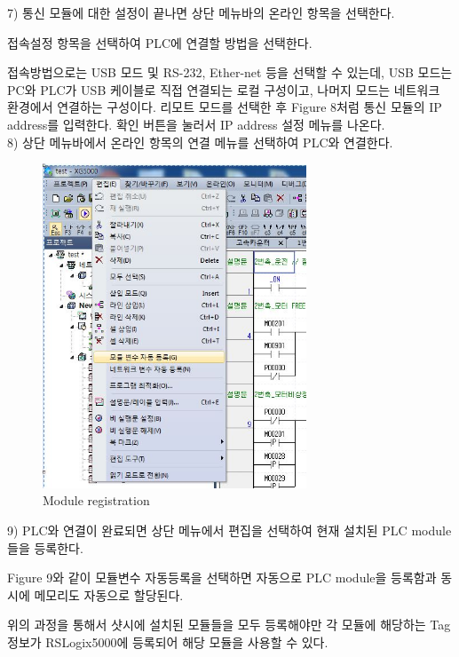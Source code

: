 \documentclass[11pt
  , a4paper
  , article
  , oneside
]{memoir}
\begin{document}
   7) 통신 모듈에 대한 설정이 끝나면 상단 메뉴바의 온라인 항목을 선택한다.\
   
   접속설정 항목을 선택하여 PLC에 연결할 방법을 선택한다.\
   
   접속방법으로는 USB 모드 및 RS-232, Ether-net 등을 선택할 수 있는데, USB 모드는 PC와 PLC가 USB 케이블로 직접 연결되는 로컬 구성이고, 나머지 모드는 네트워크 환경에서 연결하는 구성이다. 리모트 모드를 선택한 후 Figure 8처럼 통신 모듈의 IP address를 입력한다. 확인 버튼을 눌러서 IP address 설정 메뉴를 나온다.\\
   
   8) 상단 메뉴바에서 온라인 항목의 연결 메뉴를 선택하여 PLC와 연결한다. \\
   
     \begin{figure}[h]
     	\centering
     	\includegraphics[width=0.7\textwidth]{./picture/module_var_regist.JPG}
     	\caption{
     		Module registration
     	}
     	\label{fig:}
     \end{figure}
  
   9) PLC와 연결이 완료되면 상단 메뉴에서 편집을 선택하여 현재 설치된 PLC module들을 등록한다.\
   
     Figure 9와 같이 모듈변수 자동등록을 선택하면 자동으로 PLC module을 등록함과 동시에 메모리도 자동으로 할당된다.\\ 
 
 
 \newpage
 
 위의 과정을 통해서 샷시에 설치된 모듈들을 모두 등록해야만 각 모듈에 해당하는 Tag 정보가 RSLogix5000에 등록되어 해당 모듈을 사용할 수 있다. \
 
\end{document}
